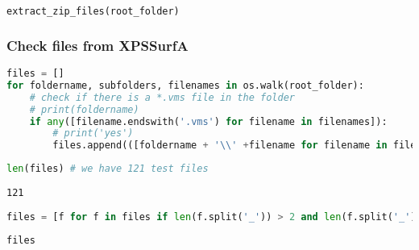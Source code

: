 \begin{lstlisting}[language=Python]
extract_zip_files(root_folder)
\end{lstlisting}

\subsubsection{Check files from XPSSurfA}\label{check-files-from-xpssurfa}

\begin{lstlisting}[language=Python]
files = []
for foldername, subfolders, filenames in os.walk(root_folder):
    # check if there is a *.vms file in the folder
    # print(foldername)
    if any([filename.endswith('.vms') for filename in filenames]):
        # print('yes')
        files.append(([foldername + '\\' +filename for filename in filenames if filename.endswith('.vms')][0]))
\end{lstlisting}

\begin{lstlisting}[language=Python]
len(files) # we have 121 test files
\end{lstlisting}

\begin{lstlisting}
121
\end{lstlisting}

\begin{lstlisting}[language=Python]
files = [f for f in files if len(f.split('_')) > 2 and len(f.split('_')[-1]) < 15 and not 'Cali' in f]
\end{lstlisting}

\begin{lstlisting}[language=Python]
files
\end{lstlisting}

